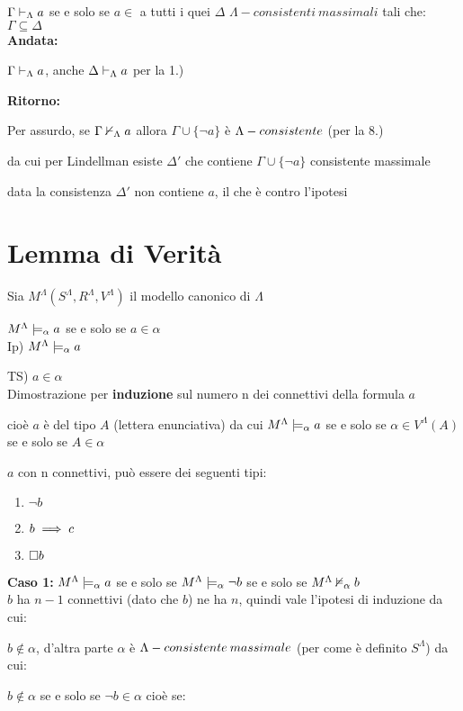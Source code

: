 $\Gamma\vdash_{\Lambda}a$ se e solo se $a\in$ a tutti i quei $\Delta$ $\Lambda-consistenti\ massimali$
tali che: $\Gamma\subseteq\Delta$\\


\textbf{Andata:}

$\Gamma\vdash_{\Lambda}a$, anche $\Delta\vdash_{\Lambda}a$ per la 1.)

\textbf{Ritorno:}

Per assurdo, se $\Gamma\nvdash_{\Lambda}a$ allora $\Gamma\cup\{\neg a\}$
è $\mbox{\ensuremath{\Lambda}}-consistente$ (per la 8.)

da cui per Lindellman esiste $\Delta'$ che contiene $\Gamma\cup\{\neg a\}$
consistente massimale

data la consistenza $\Delta'$ non contiene $a$, il che è contro
l'ipotesi \lightning 


\section{Lemma di Verità}

Sia $M^{\Lambda}(S^{\Lambda},R^{\Lambda},V^{\Lambda})$ il modello
canonico di $\Lambda$

$M^{\Lambda}\models_{\alpha}a$ se e solo se $a\in\alpha$\\


Ip) $M^{\Lambda}\models_{\alpha}a$ 

TS) $a\in\alpha$\\


Dimostrazione per \textbf{induzione} sul numero n dei connettivi della
formula $a$

 cioè $a$ è del tipo $A$ (lettera enunciativa) da
cui $M^{\Lambda}\models_{\alpha}a$ se e solo se $\alpha\in V^{\Lambda}(A)$ se e solo
se $A\in\alpha$

 $a$ con n connettivi, può essere
dei seguenti tipi:
\begin{enumerate}
\item $\neg b$
\item $b\implies c$
\item $\square b$
\end{enumerate}
\textbf{Caso 1:} $M^{\Lambda}\models_{\alpha}a$ se e solo se $M^{\Lambda}\models_{\alpha}\neg b$ se
e solo se $M^{\Lambda}\nvDash_{\alpha}b$\\


$b$ ha $n-1$ connettivi (dato che $b$) ne ha $n$, quindi vale
l'ipotesi di induzione da cui:

$b\notin\alpha$, d'altra parte $\alpha$ è $\Lambda-consistente\: massimale$ (per come
è definito $S^{\Lambda}$) da cui:

\textbf{$b\notin\alpha$ }se e solo se \textbf{$ $}$\neg b\in\alpha$
cioè se:

